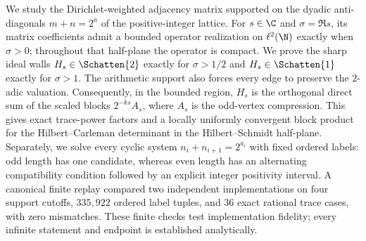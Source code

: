 We study the Dirichlet-weighted adjacency matrix supported on the dyadic
anti-diagonals $m+n=2^a$ of the positive-integer lattice.  For
$s\in\C$ and $\sigma=\Re s$, its matrix coefficients admit a bounded
operator realization on $\ell^2(\N)$ exactly when $\sigma>0$; throughout
that half-plane the operator is compact.  We prove the sharp ideal walls
$H_s\in\Schatten{2}$ exactly for $\sigma>1/2$ and
$H_s\in\Schatten{1}$ exactly for $\sigma>1$.  The arithmetic support also
forces every edge to preserve the $2$-adic valuation.  Consequently, in the
bounded region, $H_s$ is the orthogonal direct sum of the scaled blocks
$2^{-ks}A_s$, where $A_s$ is the odd-vertex compression.  This gives exact
trace-power factors and a locally uniformly convergent block product for the
Hilbert--Carleman determinant in the Hilbert--Schmidt half-plane.  Separately,
we solve every cyclic system $n_i+n_{i+1}=2^{a_i}$ with fixed ordered labels:
odd length has one candidate, whereas even length has an alternating
compatibility condition followed by an explicit integer positivity interval.
A canonical finite replay compared two independent implementations on four
support cutoffs, $335{,}922$ ordered label tuples, and $36$ exact rational
trace cases, with zero mismatches.  These finite checks test implementation
fidelity; every infinite statement and endpoint is established analytically.
